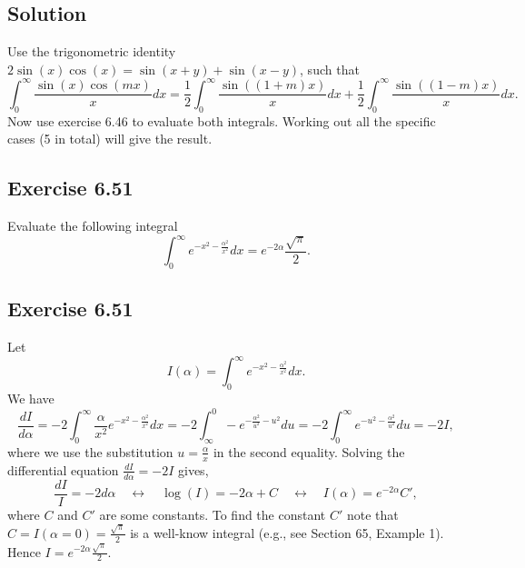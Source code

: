 \subsection*{Solution}

Use the trigonometric identity $2 \sin(x) \cos(x) = \sin(x + y) + \sin(x - y)$, such that
\begin{equation*}
    \int_0^{\infty} \frac{\sin(x) \cos(mx)}{x} dx
        = \frac{1}{2} \int_0^{\infty} \frac{\sin((1 + m)x)}{x} dx + \frac{1}{2} \int_0^{\infty} \frac{\sin((1 - m)x)}{x} dx.
\end{equation*}
Now use exercise 6.46 to evaluate both integrals.
Working out all the specific cases (5 in total) will give the result.


\subsection*{Exercise 6.51}

Evaluate the following integral
\begin{equation*}
    \int_0^{\infty} e^{-x^2 - \frac{\alpha^2}{x^2}} dx = e^{-2\alpha} \frac{\sqrt{\pi}}{2}.
\end{equation*}


\subsection*{Exercise 6.51}

Let
\begin{equation*}
    I(\alpha) = \int_0^{\infty} e^{-x^2 - \frac{\alpha^2}{x^2}} dx.
\end{equation*}
We have
\begin{equation*}
    \frac{dI}{d\alpha}
        = -2 \int_0^{\infty} \frac{\alpha}{x^2} e^{-x^2 - \frac{\alpha^2}{x^2}} dx
        = -2 \int_{\infty}^{0} -e^{-\frac{\alpha^2}{u^2} - u^2} du
        = -2 \int_0^{\infty} e^{-u^2 - \frac{\alpha^2}{u^2}} du
        = -2 I,
\end{equation*}
where we use the substitution $u = \frac{\alpha}{x}$ in the second equality.
Solving the differential equation $\frac{dI}{d\alpha} = -2I$ gives,
\begin{equation*}
    \frac{dI}{I} = -2 d\alpha
        \quad \leftrightarrow \quad \log(I) = -2\alpha + C
        \quad \leftrightarrow \quad I(\alpha) = e^{-2\alpha} C',
\end{equation*}
where $C$ and $C'$ are some constants.
To find the constant $C'$ note that $C = I(\alpha = 0) = \frac{\sqrt{\pi}}{2}$ is a well-know integral (e.g., see Section 65, Example 1).
Hence $I = e^{-2\alpha} \frac{\sqrt{\pi}}{2}$.
